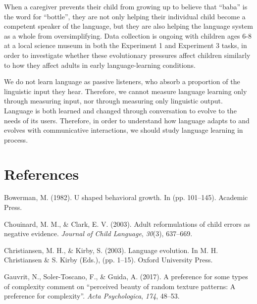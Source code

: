 \documentclass[10pt, letterpaper]{article}
\begin{document}
When a caregiver prevents their child from growing up to believe that
``baba'' is the word for ``bottle'', they are not only helping their
individual child become a competent speaker of the language, but they
are also helping the language system as a whole from oversimplifying.
Data collection is ongoing with children ages 6-8 at a local science
museum in both the Experiment 1 and Experiment 3 tasks, in order to
investigate whether these evolutionary pressures affect children
similarly to how they affect adults in early language-learning
conditions.

We do not learn language as passive listeners, who absorb a proportion
of the linguistic input they hear. Therefore, we cannot measure language
learning only through measuring input, nor through measuring only
linguistic output. Language is both learned and changed through
conversation to evolve to the needs of its users. Therefore, in order to
understand how language adapts to and evolves with communicative
interactions, we should study language learning in process.

\vspace{1em}

\section{References}\label{references}

\setlength{\parindent}{-0.1in} \setlength{\leftskip}{0.125in}

\noindent

\hypertarget{refs}{}
\hypertarget{ref-bowerman-1982}{}
Bowerman, M. (1982). U shaped behavioral growth. In (pp. 101--145).
Academic Press.

\hypertarget{ref-chouinard-2003}{}
Chouinard, M. M., \& Clark, E. V. (2003). Adult reformulations of child
errors as negative evidence. \emph{Journal of Child Language},
\emph{30}(3), 637--669.

\hypertarget{ref-christiansen-2003}{}
Christiansen, M. H., \& Kirby, S. (2003). Language evolution. In M. H.
Christiansen \& S. Kirby (Eds.), (pp. 1--15). Oxford University Press.

\hypertarget{ref-gauvrit-2017}{}
Gauvrit, N., Soler-Toscano, F., \& Guida, A. (2017). A preference for
some types of complexity comment on ``perceived beauty of random texture
patterns: A preference for complexity''. \emph{Acta Psychologica},
\emph{174}, 48--53.
\end{document}
